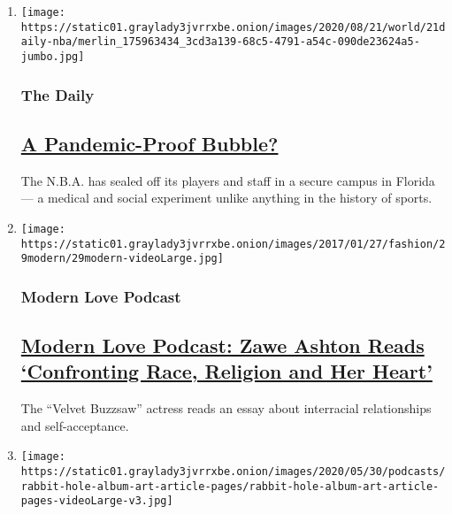 \begin{enumerate}
\def\labelenumi{\arabic{enumi}.}
\item
  \texttt{[image: https://static01.graylady3jvrrxbe.onion/images/2020/08/21/world/21daily-nba/merlin\_175963434\_3cd3a139-68c5-4791-a54c-090de23624a5-jumbo.jpg]}

  \hypertarget{the-daily}{%
  \subsubsection{The Daily}\label{the-daily}}

  \hypertarget{a-pandemic-proof-bubble}{%
  \subsection{\texorpdfstring{\href{/2020/08/21/podcasts/the-daily/nba-coronavirus-basketball.html}{A
  Pandemic-Proof
  Bubble?}}{A Pandemic-Proof Bubble?}}\label{a-pandemic-proof-bubble}}

  The N.B.A. has sealed off its players and staff in a secure campus in
  Florida --- a medical and social experiment unlike anything in the
  history of sports.
\item
  \texttt{[image: https://static01.graylady3jvrrxbe.onion/images/2017/01/27/fashion/29modern/29modern-videoLarge.jpg]}

  \hypertarget{modern-love-podcast}{%
  \subsubsection{Modern Love Podcast}\label{modern-love-podcast}}

  \hypertarget{modern-love-podcast-zawe-ashton-reads-confronting-race-religion-and-her-heart}{%
  \subsection{\texorpdfstring{\href{/2020/06/24/style/modern-love-podcast-zawe-ashton.html}{Modern
  Love Podcast: Zawe Ashton Reads `Confronting Race, Religion and Her
  Heart'}}{Modern Love Podcast: Zawe Ashton Reads `Confronting Race, Religion and Her Heart'}}\label{modern-love-podcast-zawe-ashton-reads-confronting-race-religion-and-her-heart}}

  The ``Velvet Buzzsaw'' actress reads an essay about interracial
  relationships and self-acceptance.
\item
  \texttt{[image: https://static01.graylady3jvrrxbe.onion/images/2020/05/30/podcasts/rabbit-hole-album-art-article-pages/rabbit-hole-album-art-article-pages-videoLarge-v3.jpg]}


\end{enumerate}
